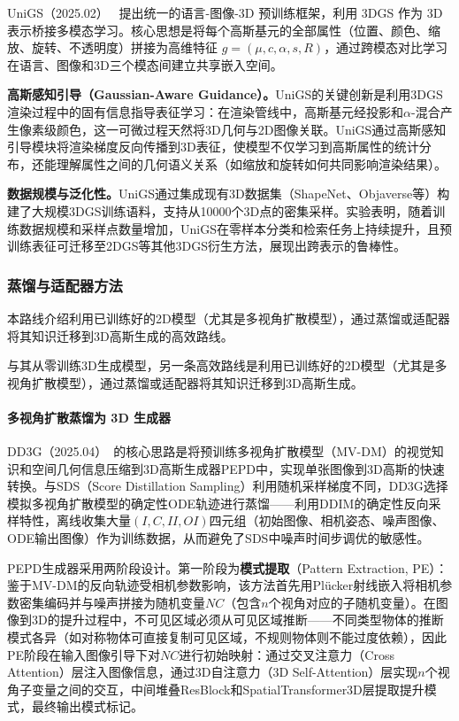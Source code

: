 UniGS（2025.02）~\cite{2502_17860} 提出统一的语言-图像-3D 预训练框架，利用 3DGS 作为 3D 表示桥接多模态学习。核心思想是将每个高斯基元的全部属性（位置、颜色、缩放、旋转、不透明度）拼接为高维特征 $g = (\mu, c, \alpha, s, R)$，通过跨模态对比学习在语言、图像和3D三个模态间建立共享嵌入空间。

\textbf{高斯感知引导（Gaussian-Aware Guidance）。}UniGS的关键创新是利用3DGS渲染过程中的固有信息指导表征学习：在渲染管线中，高斯基元经投影和$\alpha$-混合产生像素级颜色，这一可微过程天然将3D几何与2D图像关联。UniGS通过高斯感知引导模块将渲染梯度反向传播到3D表征，使模型不仅学习到高斯属性的统计分布，还能理解属性之间的几何语义关系（如缩放和旋转如何共同影响渲染结果）。

\textbf{数据规模与泛化性。}UniGS通过集成现有3D数据集（ShapeNet、Objaverse等）构建了大规模3DGS训练语料，支持从10000个3D点的密集采样。实验表明，随着训练数据规模和采样点数量增加，UniGS在零样本分类和检索任务上持续提升，且预训练表征可迁移至2DGS等其他3DGS衍生方法，展现出跨表示的鲁棒性。

\subsubsection{蒸馏与适配器方法}

本路线介绍利用已训练好的2D模型（尤其是多视角扩散模型），通过蒸馏或适配器将其知识迁移到3D高斯生成的高效路线。

与其从零训练3D生成模型，另一条高效路线是利用已训练好的2D模型（尤其是多视角扩散模型），通过蒸馏或适配器将其知识迁移到3D高斯生成。

\paragraph{多视角扩散蒸馏为 3D 生成器}

DD3G（2025.04）~\cite{2504_00457}的核心思路是将预训练多视角扩散模型（MV-DM）的视觉知识和空间几何信息压缩到3D高斯生成器PEPD中，实现单张图像到3D高斯的快速转换。与SDS（Score Distillation Sampling）利用随机采样梯度不同，DD3G选择模拟多视角扩散模型的确定性ODE轨迹进行蒸馏——利用DDIM的确定性反向采样特性，离线收集大量$(I, C, II, OI)$四元组（初始图像、相机姿态、噪声图像、ODE输出图像）作为训练数据，从而避免了SDS中噪声时间步调优的敏感性。

PEPD生成器采用两阶段设计。第一阶段为\textbf{模式提取}（Pattern Extraction, PE）：鉴于MV-DM的反向轨迹受相机参数影响，该方法首先用Plücker射线嵌入将相机参数密集编码并与噪声拼接为随机变量$NC$（包含$n$个视角对应的子随机变量）。在图像到3D的提升过程中，不可见区域必须从可见区域推断——不同类型物体的推断模式各异（如对称物体可直接复制可见区域，不规则物体则不能过度依赖），因此PE阶段在输入图像引导下对$NC$进行初始映射：通过交叉注意力（Cross Attention）层注入图像信息，通过3D自注意力（3D Self-Attention）层实现$n$个视角子变量之间的交互，中间堆叠ResBlock和SpatialTransformer3D层提取提升模式，最终输出模式标记。

